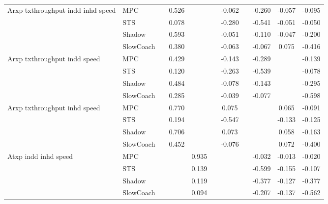 \begin{tabular}{|l|l|*{9}{c|}}
\midrule
Arxp txthroughput indd inhd speed    & MPC &       &     0.526 &        &     & -0.062 &     &  -0.260 &  -0.057 &   -0.095 \\
                              & STS &       &     0.078 &        &     & -0.280 &     &  -0.541 &  -0.051 &   -0.050 \\
                              & Shadow &       &     0.593 &        &     & -0.051 &     &  -0.110 &  -0.047 &   -0.200 \\
                              & SlowCoach &       &     0.380 &        &     & -0.063 &     &  -0.067 &   0.075 &   -0.416 \\
\midrule
Arxp txthroughput indd speed    & MPC &       &     0.429 &        &     & -0.143 &     &  -0.289 &      &   -0.139 \\
                              & STS &       &     0.120 &        &     & -0.263 &     &  -0.539 &      &   -0.078 \\
                              & Shadow &       &     0.484 &        &     & -0.078 &     &  -0.143 &      &   -0.295 \\
                              & SlowCoach &       &     0.285 &        &     & -0.039 &     &  -0.077 &      &   -0.598 \\
\midrule
Arxp txthroughput inhd speed    & MPC &       &     0.770 &        &     &  0.075 &     &      &   0.065 &   -0.091 \\
                              & STS &       &     0.194 &        &     & -0.547 &     &      &  -0.133 &   -0.125 \\
                              & Shadow &       &     0.706 &        &     &  0.073 &     &      &   0.058 &   -0.163 \\
                              & SlowCoach &       &     0.452 &        &     & -0.076 &     &      &   0.072 &   -0.400 \\
\midrule
Atxp indd inhd speed    & MPC &       &        &     0.935 &     &     &     &  -0.032 &  -0.013 &   -0.020 \\
                              & STS &       &        &     0.139 &     &     &     &  -0.599 &  -0.155 &   -0.107 \\
                              & Shadow &       &        &     0.119 &     &     &     &  -0.377 &  -0.127 &   -0.377 \\
                              & SlowCoach &       &        &     0.094 &     &     &     &  -0.207 &  -0.137 &   -0.562 \\

\end{tabular}
